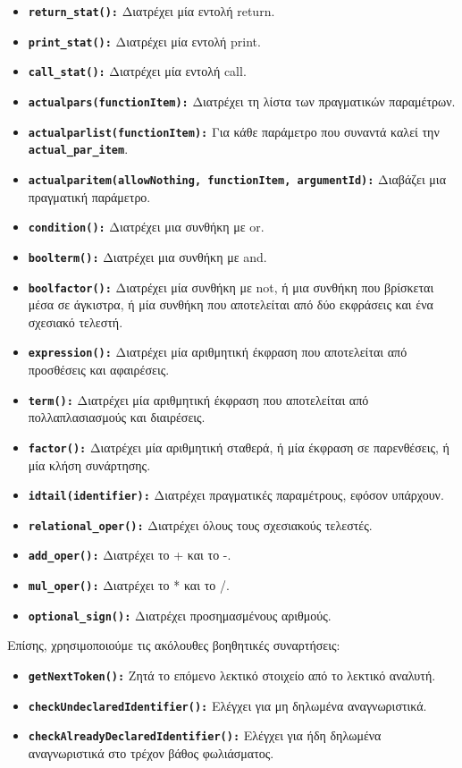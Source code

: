 \documentclass[a4paper]{article}
\let\OldTexttt\texttt
\renewcommand{\texttt}[1]{\OldTexttt{\textbf{#1}}}
\begin{document}
\begin{itemize}
    \item \texttt{return\_stat():} Διατρέχει μία εντολή return.
    \item \texttt{print\_stat():} Διατρέχει μία εντολή print.
    \item \texttt{call\_stat():} Διατρέχει μία εντολή call.
    \item \texttt{actualpars(functionItem):} Διατρέχει τη λίστα των
        πραγματικών παραμέτρων.
    \item \texttt{actualparlist(functionItem):} Για κάθε παράμετρο που
        συναντά καλεί την \texttt{actual\_par\_item}.
    \item \texttt{actualparitem(allowNothing, functionItem, argumentId):}
        Διαβάζει μια πραγματική παράμετρο.
    \item \texttt{condition():} Διατρέχει μια συνθήκη με or.
    \item \texttt{boolterm():} Διατρέχει μια συνθήκη με and.
    \item \texttt{boolfactor():} Διατρέχει μία συνθήκη με not, ή μια
        συνθήκη που βρίσκεται μέσα σε άγκιστρα, ή μία συνθήκη που
        αποτελείται από δύο εκφράσεις και ένα σχεσιακό τελεστή.
    \item \texttt{expression():} Διατρέχει μία αριθμητική έκφραση που
        αποτελείται από προσθέσεις και αφαιρέσεις.
    \item \texttt{term():} Διατρέχει μία αριθμητική έκφραση που αποτελείται
        από πολλαπλασιασμούς και διαιρέσεις.
    \item \texttt{factor():} Διατρέχει μία αριθμητική σταθερά, ή μία
        έκφραση σε παρενθέσεις, ή μία κλήση συνάρτησης.
    \item \texttt{idtail(identifier):} Διατρέχει πραγματικές παραμέτρους,
        εφόσον υπάρχουν.
    \item \texttt{relational\_oper():} Διατρέχει όλους τους σχεσιακούς
        τελεστές.
    \item \texttt{add\_oper():} Διατρέχει το + και το -.
    \item \texttt{mul\_oper():} Διατρέχει το * και το /.
    \item \texttt{optional\_sign():} Διατρέχει προσημασμένους αριθμούς.
\end{itemize}

Επίσης, χρησιμοποιούμε τις ακόλουθες βοηθητικές συναρτήσεις:
\begin{itemize}
    \item \texttt{getNextToken():} Ζητά το επόμενο λεκτικό στοιχείο από το
        λεκτικό αναλυτή.
    \item \texttt{checkUndeclaredIdentifier():} Ελέγχει για μη δηλωμένα
        αναγνωριστικά.
    \item \texttt{checkAlreadyDeclaredIdentifier():} Ελέγχει για ήδη
        δηλωμένα αναγνωριστικά στο τρέχον βάθος φωλιάσματος.
\end{itemize}
\end{document}
